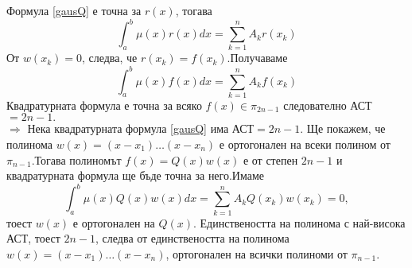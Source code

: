 \documentclass[12pt]{article}
\numberwithin{equation}{subsection}
\numberwithin{theorem}{subsection}
\numberwithin{definition}{subsection}
\numberwithin{corollary}{subsection}
\begin{document}
  Формула \ref{gausQ} е точна за $r(x)$, тогава
  \begin{equation*}
    \int_{a}^{b}\mu(x)r(x)dx=\sum_{k=1}^{n}A_kr(x_k)
  \end{equation*}
  От $w(x_k)=0$, следва, че $r(x_k)=f(x_k)$.Получаваме
  \begin{equation*}
    \int_{a}^{b}\mu(x)f(x)dx = \sum_{k=1}^{n}A_kf(x_k)
  \end{equation*}
  Квадратурната формула е точна за всяко $f(x)\in\pi_{2n-1}$ следователно АСТ$=2n-1.$\\
  $\Rightarrow$
  Нека квадратурната формула \ref{gausQ} има АСТ$=2n-1$. Ще покажем, че полинома $w(x)=(x-x_1)\ldots(x-x_n)$ е ортогонален на всеки полином от $\pi_{n-1}$.Тогава полиномът $f(x)=Q(x)w(x)$ е от степен $2n-1$ и квадратурната формула ще бъде точна за него.Имаме
  \begin{equation*}
    \int_{a}^{b}\mu(x)Q(x)w(x)dx=\sum_{k=1}^{n}A_kQ(x_k)w(x_k)=0,
  \end{equation*}
  тоест $w(x)$ е ортогонален на $Q(x)$.
  Единствеността на полинома с най-висока АСТ,  тоест $2n-1$, следва от единствеността на полинома $w(x)=(x-x_1)\ldots(x-x_n)$, ортогонален на всички полиноми от $\pi_{n-1}$.
\end{document}
